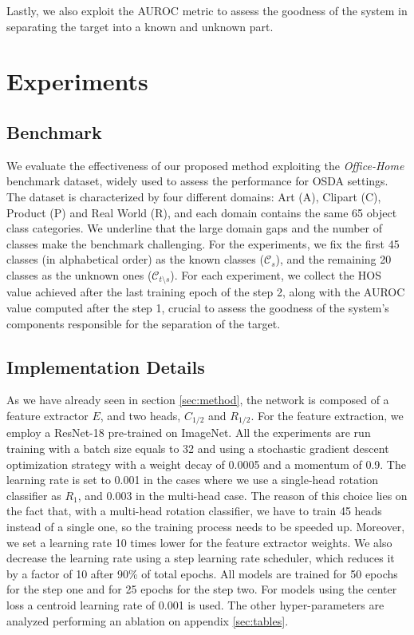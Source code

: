\documentclass[10pt,twocolumn,letterpaper]{article}
\begin{document}
Lastly, we also exploit the AUROC metric to assess the goodness of the system in separating
the target into a known and unknown part.

\section{Experiments}
\label{sec:experiments}

\subsection{Benchmark}
\label{sec:dataset}

We evaluate the effectiveness of our proposed method exploiting the {\it Office-Home} \cite{OfficeHomeDataset} benchmark dataset,
widely used to assess the performance for OSDA settings.
The dataset is characterized by four different domains: Art (A), Clipart (C), Product (P) and Real World (R), and
each domain contains the same 65 object class categories.
We underline that the large domain gaps and the number of classes make the benchmark challenging.
For the experiments, we fix the first 45 classes (in alphabetical order) as the known classes ($\mathcal{C}_s$),
and the remaining 20 classes as the unknown ones ($\mathcal{C}_{t \setminus s}$).
For each experiment, we collect the HOS value achieved after the last training epoch of the step 2,
along with the AUROC value computed after the step 1, crucial to assess the goodness
of the system's components responsible for the separation of the target.

\subsection{Implementation Details}
\label{sec:implementation_details}

As we have already seen in section \ref{sec:method}, the network is composed of a feature extractor $E$, and two heads, $C_{1/2}$ and $R_{1/2}$.
For the feature extraction, we employ a ResNet-18\cite{ResNet18} pre-trained on ImageNet.
All the experiments are run training with a batch size equals to 32 and using a stochastic gradient descent optimization strategy
with a weight decay of 0.0005 and a momentum of 0.9.
The learning rate is set to 0.001 in the cases where we use a single-head rotation classifier as $R_1$, and 0.003 in the multi-head case.
The reason of this choice lies on the fact that, with a multi-head rotation classifier, we have to train 45 heads instead of a single one,
so the training process needs to be speeded up.
Moreover, we set a learning rate 10 times lower for the feature extractor weights.
We also decrease the learning rate using a step learning rate scheduler, which reduces it by a factor of 10 after 90\% of total epochs.
All models are trained for 50 epochs for the step one and for 25 epochs for the step two.
For models using the center loss a centroid learning rate of 0.001 is used.
The other hyper-parameters are analyzed performing an ablation on appendix \ref{sec:tables}.
\end{document}
